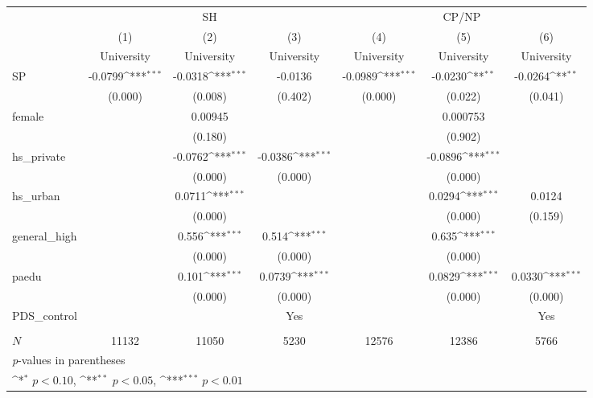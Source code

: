 \documentclass[]{AEA}
\def\sym#1{\ifmmode^{#1}\else\(^{#1}\)\fi}
\begin{document}
    \centering
    \setlength{\tabcolsep}{0.5mm}
    \begin{tabular}{l*{6}c}
    \toprule
    &\multicolumn{3}{c}{SH} &\multicolumn{3}{c}{CP/NP} \\
    \cmidrule(l){2-4}\cmidrule(l){5-7}
    &\multicolumn{1}{c}{(1)}&\multicolumn{1}{c}{(2)}&\multicolumn{1}{c}{(3)}&\multicolumn{1}{c}{(4)}&\multicolumn{1}{c}{(5)}&\multicolumn{1}{c}{(6)} \\
    &\multicolumn{1}{c}{University}&\multicolumn{1}{c}{University}&\multicolumn{1}{c}{University}&\multicolumn{1}{c}{University}&\multicolumn{1}{c}{University}&\multicolumn{1}{c}{University} \\
    \midrule
    SP & -0.0799\sym{***}& -0.0318\sym{***}& -0.0136     & -0.0989\sym{***}& -0.0230\sym{**} & -0.0264\sym{**} \\
    & (0.000)     & (0.008)     & (0.402)     & (0.000)     & (0.022)     & (0.041)     \\
    [1em]
    female  &   & 0.00945     &   &   &    0.000753     &   \\
    &   & (0.180)     &   &   & (0.902)     &   \\
    [1em]
    hs\_private  &   & -0.0762\sym{***}& -0.0386\sym{***}&   & -0.0896\sym{***}&   \\
    &   & (0.000)     & (0.000)     &   & (0.000)     &   \\
    [1em]
    hs\_urban    &   &  0.0711\sym{***}&   &   &  0.0294\sym{***}&  0.0124     \\
    &   & (0.000)     &   &   & (0.000)     & (0.159)     \\
    [1em]
    general\_high&   &   0.556\sym{***}&   0.514\sym{***}&   &   0.635\sym{***}&   \\
    &   & (0.000)     & (0.000)     &   & (0.000)     &   \\
    [1em]
    paedu   &   &   0.101\sym{***}&  0.0739\sym{***}&   &  0.0829\sym{***}&  0.0330\sym{***}\\
    &   & (0.000)     & (0.000)     &   & (0.000)     & (0.000)     \\
    [1em]
    PDS\_control  &   &  &  Yes    &  &    &  Yes \\
    &   &      &      &   &      &      \\
    \hline
    \(N\)   &   11132     &   11050     &    5230     &   12576     &   12386     &    5766     \\
    \bottomrule
    \multicolumn{7}{l}{\footnotesize \textit{p}-values in parentheses} \\
    \multicolumn{7}{l}{\footnotesize \sym{*} \(p<0.10\), \sym{**} \(p<0.05\), \sym{***} \(p<0.01\)} \\
    \end{tabular}
\end{document}
